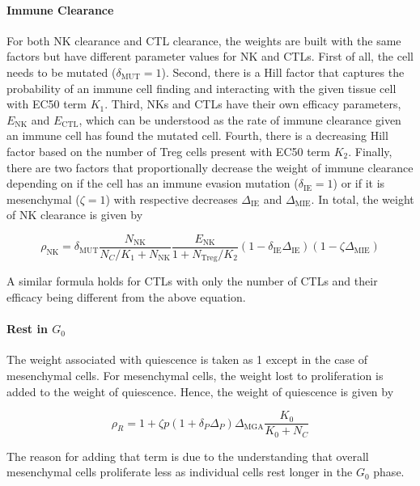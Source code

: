 \documentclass[11pt]{article}
\begin{document}
\paragraph{Immune Clearance}
For both NK clearance and CTL clearance, the weights are built with the same factors but have different parameter values for NK and CTLs.
First of all, the cell needs to be mutated ($\delta_{\text{MUT}}=1$).
Second, there is a Hill factor that captures the probability of an immune cell finding and interacting with the given tissue cell with EC50 term $K_1$.
Third, NKs and CTLs have their own efficacy parameters, $E_{\text{NK}}$ and $E_{\text{CTL}}$, which can be understood as the rate of immune clearance given an immune cell has found the mutated cell.
Fourth, there is a decreasing Hill factor based on the number of Treg cells present with EC50 term $K_2$.
Finally, there are two factors that proportionally decrease the weight of immune clearance depending on if the cell has an immune evasion mutation ($\delta_{\text{IE}}=1$) or if it is mesenchymal ($\zeta=1$) with respective decreases $\Delta_{\text{IE}}$ and $\Delta_{\text{MIE}}$.
In total, the weight of NK clearance is given by

\begin{equation}\tag{2.3}
\rho_{\text{NK}} =\delta_{\text{MUT}} \frac{N_{\text{NK}}}{N_C/K_{1}+N_{\text{NK}}}  \frac{E_{\text{NK}}}{1+N_{\text{Treg}}/K_2} (1-\delta_{\text{IE}}\Delta_{\text{IE}})(1-\zeta \Delta_{\text{MIE}})
\end{equation}

A similar formula holds for CTLs with only the number of CTLs and their efficacy being different from the above equation.


\paragraph{Rest in $G_0$} 
The weight associated with quiescence is taken as 1 except in the case of mesenchymal cells.
For mesenchymal cells, the weight lost to proliferation is added to the weight of quiescence.
Hence, the weight of quiescence is given by

\begin{equation}\tag{2.4}
\rho_R = 1 + \zeta p(1+\delta_P\Delta_P)\Delta_{\text{MGA}}\frac{K_0}{K_0+N_C}
\end{equation}

The reason for adding that term is due to the understanding that overall mesenchymal cells proliferate less as individual cells rest longer in the $G_0$ phase.
\end{document}
